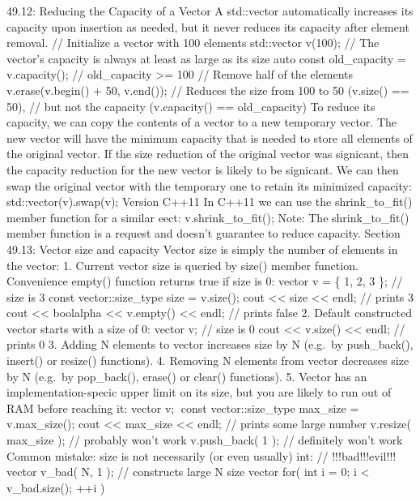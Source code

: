 49.12: Reducing the Capacity of a Vector A std::vector automatically
increases its capacity upon insertion as needed, but it never reduces
its capacity after element removal. // Initialize a vector with 100
elements std::vector v(100); // The vector's capacity is always at least
as large as its size auto const old\_capacity = v.capacity(); //
old\_capacity \textgreater= 100 // Remove half of the elements
v.erase(v.begin() + 50, v.end()); // Reduces the size from 100 to 50
(v.size() == 50), // but not the capacity (v.capacity() ==
old\_capacity) To reduce its capacity, we can copy the contents of a
vector to a new temporary vector. The new vector will have the minimum
capacity that is needed to store all elements of the original vector. If
the size reduction of the original vector was signicant, then the
capacity reduction for the new vector is likely to be signicant. We can
then swap the original vector with the temporary one to retain its
minimized capacity: std::vector(v).swap(v); Version C++11 In C++11 we
can use the shrink\_to\_fit() member function for a similar eect:
v.shrink\_to\_fit(); Note: The shrink\_to\_fit() member function is a
request and doesn't guarantee to reduce capacity. Section 49.13: Vector
size and capacity Vector size is simply the number of elements in the
vector: 1. Current vector size is queried by size() member function.
Convenience empty() function returns true if size is 0: vector v = \{ 1,
2, 3 \}; // size is 3 const vector::size\_type size = v.size(); cout
\textless\textless{} size \textless\textless{} endl; // prints 3 cout
\textless\textless{} boolalpha \textless\textless{} v.empty()
\textless\textless{} endl; // prints false 2. Default constructed vector
starts with a size of 0: vector v; // size is 0 cout
\textless\textless{} v.size() \textless\textless{} endl; // prints 0 3.
Adding N elements to vector increases size by N (e.g.~by push\_back(),
insert() or resize() functions). 4. Removing N elements from vector
decreases size by N (e.g.~by pop\_back(), erase() or clear() functions).
5. Vector has an implementation-specic upper limit on its size, but you
are likely to run out of RAM before reaching it: vector v; const
vector::size\_type max\_size = v.max\_size(); cout \textless\textless{}
max\_size \textless\textless{} endl; // prints some large number
v.resize( max\_size ); // probably won't work v.push\_back( 1 ); //
definitely won't work Common mistake: size is not necessarily (or even
usually) int: // !!!bad!!!evil!!! vector v\_bad( N, 1 ); // constructs
large N size vector for( int i = 0; i \textless{} v\_bad.size(); ++i )
